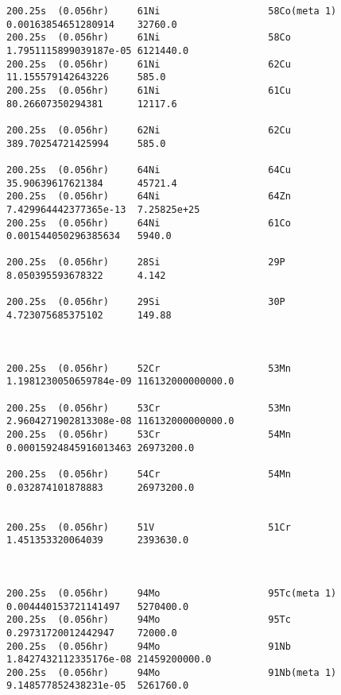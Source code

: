 \begin{lstlisting}[style=sOutputFile,caption={Final results for steel irradiation},label={listing:alexsteel}]
200.25s  (0.056hr)     61Ni                   58Co(meta 1)           0.00163854651280914    32760.0               
200.25s  (0.056hr)     61Ni                   58Co                   1.7951115899039187e-05 6121440.0             
200.25s  (0.056hr)     61Ni                   62Cu                   11.155579142643226     585.0                 
200.25s  (0.056hr)     61Ni                   61Cu                   80.26607350294381      12117.6               

200.25s  (0.056hr)     62Ni                   62Cu                   389.70254721425994     585.0                 

200.25s  (0.056hr)     64Ni                   64Cu                   35.90639617621384      45721.4               
200.25s  (0.056hr)     64Ni                   64Zn                   7.429964442377365e-13  7.25825e+25           
200.25s  (0.056hr)     64Ni                   61Co                   0.001544050296385634   5940.0                

200.25s  (0.056hr)     28Si                   29P                    8.050395593678322      4.142                 

200.25s  (0.056hr)     29Si                   30P                    4.723075685375102      149.88                



200.25s  (0.056hr)     52Cr                   53Mn                   1.1981230050659784e-09 116132000000000.0     

200.25s  (0.056hr)     53Cr                   53Mn                   2.9604271902813308e-08 116132000000000.0     
200.25s  (0.056hr)     53Cr                   54Mn                   0.00015924845916013463 26973200.0            

200.25s  (0.056hr)     54Cr                   54Mn                   0.032874101878883      26973200.0            


200.25s  (0.056hr)     51V                    51Cr                   1.451353320064039      2393630.0             



200.25s  (0.056hr)     94Mo                   95Tc(meta 1)           0.004440153721141497   5270400.0             
200.25s  (0.056hr)     94Mo                   95Tc                   0.29731720012442947    72000.0               
200.25s  (0.056hr)     94Mo                   91Nb                   1.8427432112335176e-08 21459200000.0         
200.25s  (0.056hr)     94Mo                   91Nb(meta 1)           9.148577852438231e-05  5261760.0             


\end{lstlisting}
